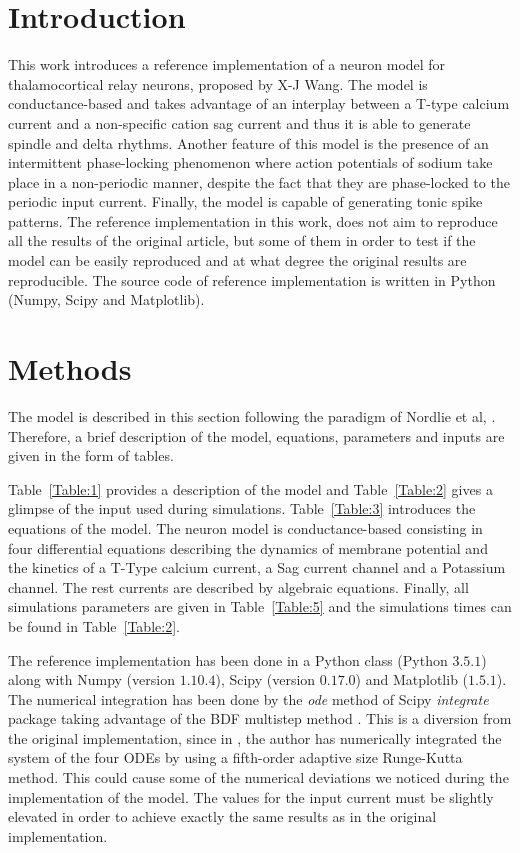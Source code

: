 \documentclass[10pt,a4paper,onecolumn]{article}
\begin{document}
\section{Introduction}\label{introduction}

This work introduces a reference implementation of a neuron model 
for thalamocortical relay neurons, \cite{wang:1994} proposed by X-J Wang.
The model is conductance-based and takes advantage of an interplay between 
a T-type calcium current and a non-specific cation sag current and thus it
is able to generate spindle and delta rhythms. Another feature of this model
is the presence of an intermittent phase-locking phenomenon
where action potentials of sodium take place in a non-periodic manner, despite
the fact that they are phase-locked to the periodic input current. Finally,
the model is capable of generating tonic spike patterns. The reference 
implementation in this work, does not aim to reproduce all the results of 
the original article, but some of them in order to test if the model can be
easily reproduced and at what degree the original results are reproducible.
The source code of reference implementation is written in Python (Numpy,
Scipy and Matplotlib). 


\section{Methods}\label{methods}

The model is described in this section following the paradigm of 
Nordlie et al, \cite{nordlie:2009}. Therefore, a brief description of
the model, equations, parameters and inputs are given in the form of 
tables. 

Table~\ref{Table:1} provides a description of the model and Table~\ref{Table:2}
gives a glimpse of the input used during simulations. Table~\ref{Table:3}
introduces the equations of the model. The neuron model is conductance-based
consisting in four differential equations describing the dynamics of membrane
potential and the kinetics of a T-Type calcium current, a Sag current channel
and a Potassium channel. The rest currents are described by algebraic
equations. Finally, all simulations parameters are given in
Table~\ref{Table:5} and the simulations times can be found in
Table~\ref{Table:2}.

The reference implementation has been done in a Python class (Python $3.5.1$)
along with Numpy (version $1.10.4$), Scipy (version $0.17.0$) and Matplotlib
($1.5.1$). The numerical integration has been done by the \emph{ode} method 
of Scipy \emph{integrate} package taking advantage of the BDF multistep method
\cite{ascher:1998}. This is a diversion from the original implementation, since
in \cite{wang:1994}, the author has numerically integrated the system of 
the four ODEs by using a fifth-order adaptive size Runge-Kutta method. This
could cause some of the numerical deviations we noticed during the
implementation of the model. The values for the input current must be 
slightly elevated in order to achieve exactly the same results as
in the original implementation. 
\end{document}

